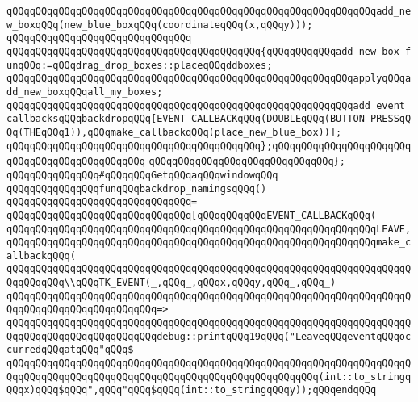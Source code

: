 \verb|qQQqqQQqqQQqqQQqqQQqqQQqqQQqqQQqqQQqqQQqqQQqqQQqqQQqqQQqqQQqqQQqadd_new_boxqQQq(new_blue_boxqQQq(coordinateqQQq(x,qQQqy)));|\newline
\verb|qQQqqQQqqQQqqQQqqQQqqQQqqQQqqQQq|\newline
\verb|qQQqqQQqqQQqqQQqqQQqqQQqqQQqqQQqqQQqqQQqqQQq{qQQqqQQqqQQqadd_new_box_funqQQq:=qQQqdrag_drop_boxes::placeqQQqddboxes;|\newline
\verb|qQQqqQQqqQQqqQQqqQQqqQQqqQQqqQQqqQQqqQQqqQQqqQQqqQQqqQQqqQQqapplyqQQqadd_new_boxqQQqall_my_boxes;|\newline
\verb|qQQqqQQqqQQqqQQqqQQqqQQqqQQqqQQqqQQqqQQqqQQqqQQqqQQqqQQqqQQqadd_event_callbacksqQQqbackdropqQQq[EVENT_CALLBACKqQQq(DOUBLEqQQq(BUTTON_PRESSqQQq(THEqQQq1)),qQQqmake_callbackqQQq(place_new_blue_box))];|\newline
\verb|qQQqqQQqqQQqqQQqqQQqqQQqqQQqqQQqqQQqqQQqqQQq};qQQqqQQqqQQqqQQqqQQqqQQqqQQqqQQqqQQqqQQqqQQqqQQq|\newline
\verb|qQQqqQQqqQQqqQQqqQQqqQQqqQQqqQQq};|\newline
\newline
\newline
\verb|qQQqqQQqqQQqqQQq#qQQqqQQqGetqQQqaqQQqwindowqQQq|\newline
\newline
\verb|qQQqqQQqqQQqqQQqfunqQQqbackdrop_namingsqQQq()|\newline
\verb|qQQqqQQqqQQqqQQqqQQqqQQqqQQqqQQq=|\newline
\verb|qQQqqQQqqQQqqQQqqQQqqQQqqQQqqQQq[qQQqqQQqqQQqEVENT_CALLBACKqQQq(|\newline
\verb|qQQqqQQqqQQqqQQqqQQqqQQqqQQqqQQqqQQqqQQqqQQqqQQqqQQqqQQqqQQqqQQqLEAVE,|\newline
\verb|qQQqqQQqqQQqqQQqqQQqqQQqqQQqqQQqqQQqqQQqqQQqqQQqqQQqqQQqqQQqqQQqmake_callbackqQQq(|\newline
\verb|qQQqqQQqqQQqqQQqqQQqqQQqqQQqqQQqqQQqqQQqqQQqqQQqqQQqqQQqqQQqqQQqqQQqqQQqqQQqqQQq\\qQQqTK_EVENT(_,qQQq_,qQQqx,qQQqy,qQQq_,qQQq_)|\newline
\verb|qQQqqQQqqQQqqQQqqQQqqQQqqQQqqQQqqQQqqQQqqQQqqQQqqQQqqQQqqQQqqQQqqQQqqQQqqQQqqQQqqQQqqQQqqQQqqQQq=>|\newline
\verb|qQQqqQQqqQQqqQQqqQQqqQQqqQQqqQQqqQQqqQQqqQQqqQQqqQQqqQQqqQQqqQQqqQQqqQQqqQQqqQQqqQQqqQQqqQQqqQQqdebug::printqQQq19qQQq("LeaveqQQqeventqQQqoccurredqQQqatqQQq"qQQq$|\newline
\verb|qQQqqQQqqQQqqQQqqQQqqQQqqQQqqQQqqQQqqQQqqQQqqQQqqQQqqQQqqQQqqQQqqQQqqQQqqQQqqQQqqQQqqQQqqQQqqQQqqQQqqQQqqQQqqQQqqQQqqQQqqQQq(int::to_stringqQQqx)qQQq$qQQq",qQQq"qQQq$qQQq(int::to_stringqQQqy));qQQqendqQQq|\newline
